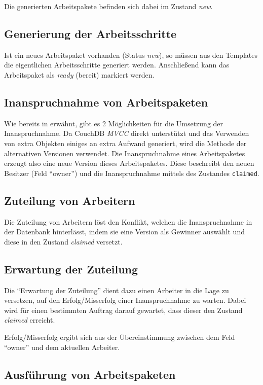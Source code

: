 Die generierten Arbeitspakete befinden sich dabei im Zustand \textit{new}.

\subsection{Generierung der Arbeitsschritte}

Ist ein neues Arbeitspaket vorhanden (Status \textit{new}), so müssen aus den Templates die eigentlichen Arbeitsschritte generiert werden.
Anschließend kann das Arbeitspaket als \textit{ready} (bereit) markiert werden.

\subsection{Inanspruchnahme von Arbeitspaketen}

Wie bereits in  erwähnt,
gibt es 2 Möglichkeiten für die Umsetzung der Inanspruchnahme.
Da CouchDB \emph{MVCC} direkt unterstützt und das Verwenden von extra Objekten einiges an extra Aufwand generiert, wird die Methode der alternativen Versionen verwendet.
Die Inanspruchnahme eines Arbeitspaketes erzeugt also eine neue Version dieses Arbeitspaketes.
Diese beschreibt den neuen Besitzer (Feld ``owner'') und die Inanspruchnahme mittels des Zustandes \verb|claimed|.

\subsection{Zuteilung von Arbeitern}
Die Zuteilung von Arbeitern löst den Konflikt,
welchen die Inanspruchnahme in der Datenbank hinterlässt,
indem sie eine Version als Gewinner auswählt und
diese in den Zustand \textit{claimed} versetzt.

\subsection{Erwartung der Zuteilung}

Die ``Erwartung der Zuteilung'' dient dazu
einen Arbeiter in die Lage zu versetzen,
auf den Erfolg/Misserfolg einer Inanspruchnahme zu warten.
Dabei wird für einen bestimmten Auftrag darauf gewartet,
dass dieser den Zustand \textit{claimed} erreicht.

Erfolg/Misserfolg ergibt sich aus der Übereinstimmung zwischen dem Feld ``owner'' und dem aktuellen Arbeiter.

\subsection{Ausführung von Arbeitspaketen}

